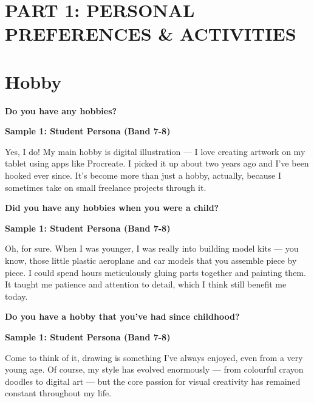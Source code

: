 \newpage

\section*{PART 1: PERSONAL PREFERENCES \& ACTIVITIES}

\section{Hobby}
\begin{ieltsquestion}
\textbf{Do you have any hobbies?}
\end{ieltsquestion}
\textbf{Sample 1: Student Persona (Band 7-8)}

Yes, I do! My main hobby is digital illustration — I love creating artwork on my tablet using apps like Procreate. I picked it up about two years ago and I've been hooked ever since. It's become more than just a hobby, actually, because I sometimes take on small freelance projects through it.

\separator

\begin{ieltsquestion}
\textbf{Did you have any hobbies when you were a child?}
\end{ieltsquestion}
\textbf{Sample 1: Student Persona (Band 7-8)}

Oh, for sure. When I was younger, I was really into building model kits — you know, those little plastic aeroplane and car models that you assemble piece by piece. I could spend hours meticulously gluing parts together and painting them. It taught me patience and attention to detail, which I think still benefit me today.

\separator

\begin{ieltsquestion}
\textbf{Do you have a hobby that you've had since childhood?}
\end{ieltsquestion}
\textbf{Sample 1: Student Persona (Band 7-8)}

Come to think of it, drawing is something I've always enjoyed, even from a very young age. Of course, my style has evolved enormously — from colourful crayon doodles to digital art — but the core passion for visual creativity has remained constant throughout my life.

\separator


